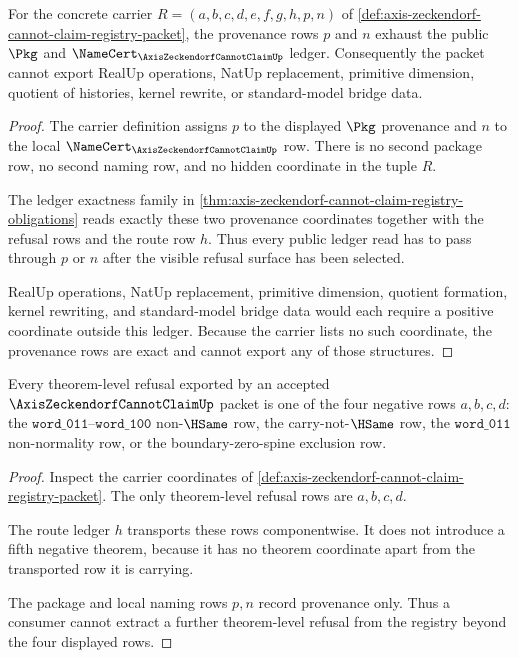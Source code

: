 \begin{theorem}
\label{thm:axis-zeckendorf-cannot-claim-ledger-exactness}
For the concrete carrier $R=(a,b,c,d,e,f,g,h,p,n)$ of \autoref{def:axis-zeckendorf-cannot-claim-registry-packet}, the provenance rows $p$ and $n$ exhaust the public $\Pkg$ and $\NameCert_{\AxisZeckendorfCannotClaimUp}$ ledger. Consequently the packet cannot export RealUp operations, NatUp replacement, primitive dimension, quotient of histories, kernel rewrite, or standard-model bridge data.
\end{theorem}
\begin{proof}
The carrier definition assigns $p$ to the displayed $\Pkg$ provenance and $n$ to the local $\NameCert_{\AxisZeckendorfCannotClaimUp}$ row. There is no second package row, no second naming row, and no hidden coordinate in the tuple $R$.

The ledger exactness family in \autoref{thm:axis-zeckendorf-cannot-claim-registry-obligations} reads exactly these two provenance coordinates together with the refusal rows and the route row $h$. Thus every public ledger read has to pass through $p$ or $n$ after the visible refusal surface has been selected.

RealUp operations, NatUp replacement, primitive dimension, quotient formation, kernel rewriting, and standard-model bridge data would each require a positive coordinate outside this ledger. Because the carrier lists no such coordinate, the provenance rows are exact and cannot export any of those structures.
\end{proof}

\begin{theorem}
\label{thm:axis-zeckendorf-cannot-claim-negative-theorem-surface}
Every theorem-level refusal exported by an accepted $\AxisZeckendorfCannotClaimUp$ packet is one of the four negative rows $a,b,c,d$: the $\mathtt{word\_011}$--$\mathtt{word\_100}$ non-$\HSame$ row, the carry-not-$\HSame$ row, the $\mathtt{word\_011}$ non-normality row, or the boundary-zero-spine exclusion row.
\end{theorem}
\begin{proof}
Inspect the carrier coordinates of \autoref{def:axis-zeckendorf-cannot-claim-registry-packet}. The only theorem-level refusal rows are $a,b,c,d$.

The route ledger $h$ transports these rows componentwise. It does not introduce a fifth negative theorem, because it has no theorem coordinate apart from the transported row it is carrying.

The package and local naming rows $p,n$ record provenance only. Thus a consumer cannot extract a further theorem-level refusal from the registry beyond the four displayed rows.
\end{proof}

